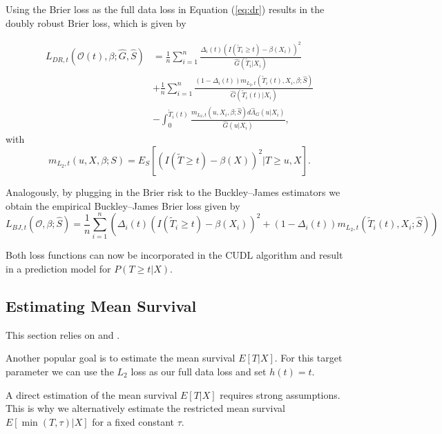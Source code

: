 \documentclass[12pt, a4paper]{scrartcl}
\theoremstyle{definition}
\theoremstyle{plain}
\numberwithin{equation}{section}
\numberwithin{figure}{section}
\numberwithin{table}{section}
\begin{document}
	Using the Brier loss as the full data loss in Equation (\ref{eq:dr}) results in the doubly robust Brier loss, which is given by
	
	\begin{equation*}
	\begin{split}
		L_{DR, t}(\mathcal{O}(t),\beta; \hat{G},\hat{S}) &={}  \frac{1}{n} \sum_{i=1}^n \frac{\Delta_i(t)(I(\tilde{T}_i \geq t)-\beta(X_i))^2}{\hat{G}(\tilde{T}_i \vert X_i)}\\
		& + \frac{1}{n} \sum_{i=1}^n \frac{(1-\Delta_i(t))m_{L_2,t}(\tilde{T}_i(t),X_i,\beta; \hat{S})}{\hat{G}(\tilde{T}_i(t) \vert X_i)}\\
		& - \int_{0}^{\tilde{T}_i(t)} \frac{m_{L_2,t}(u,X_i,\beta; \hat{S})d\hat{\Lambda}_G(u\vert X_i)}{\hat{G}(u \vert X_i)},
	\end{split}
	\end{equation*}
	 with
	 \begin{equation*}
	 	m_{L_2,t}(u,X,\beta;S) = E_S[(I(\tilde{T}\geq t)-\beta(X))^2 \vert T \geq u, X].
	 \end{equation*}
	
	Analogously, by plugging in the Brier risk to the Buckley--James estimators we obtain the empirical Buckley--James Brier loss given by
	\begin{equation*}
		L_{BJ,t}(\mathcal{O},\beta; \hat{S}) = \frac{1}{n} \sum_{i=1}^n \left( \Delta_i(t)(I(\tilde{T}_i\geq t)-\beta(X_i))^2 + (1- \Delta_i(t))m_{L_2,t}(\tilde{T}_i(t), X_i; \hat{S})\right)
	\end{equation*}
	
	Both loss functions can now be incorporated in the CUDL algorithm and result in a prediction model for $P(T\geq t\vert X)$.

	\subsection{Estimating Mean Survival}
	
	This section relies on \citet*{basearticle} and \citet*{strawderman}.
	
	Another popular goal is to estimate the mean survival $E[T\vert X]$.
	For this target parameter we can use the $L_2$ loss as our full data loss and set $h(t)=t$.

	A direct estimation of the mean survival $E[T\vert X]$ requires strong assumptions.
	This is why we alternatively estimate the restricted mean survival $E[\min(T, \tau)\vert X]$ for a fixed constant $\tau$.
	
\end{document}
